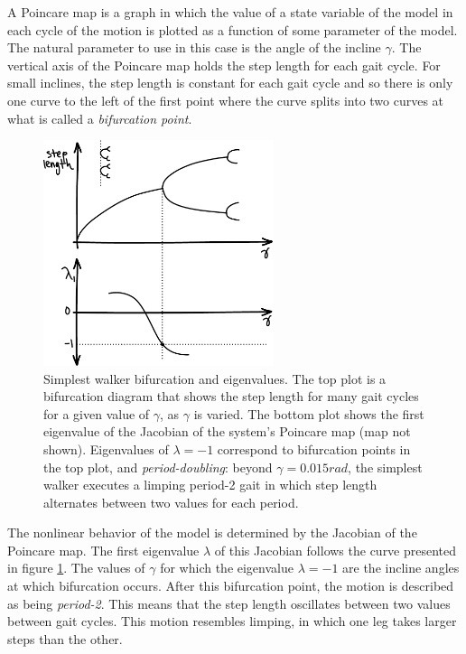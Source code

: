 A Poincare map is a graph in which the value of a state variable of the model in each cycle of the motion is plotted as a function of some parameter of the model. The natural parameter to use in this case is the angle of the incline $\gamma$. The vertical axis of the Poincare map holds the step length for each gait cycle. For small inclines, the step length is constant for each gait cycle and so there is only one curve to the left of the first point where the curve splits into two curves at what is called a \emph{bifurcation point}.

\begin{figure}[h]		%
\begin{centering}
\includegraphics[width=0.6\textwidth]{Figures/SimplestWalkerEigenvalues}\par
\end{centering}
\caption[Plot: Simplest Walker Bifurcation and Eigenvalues]{Simplest walker bifurcation and eigenvalues. The top plot is a bifurcation diagram that shows the step length for many gait cycles for a given value of $\gamma$, as $\gamma$ is varied. The bottom plot shows the first eigenvalue of the Jacobian of the system's Poincare map (map not shown). Eigenvalues of $\lambda = -1$ correspond to bifurcation points in the top plot, and \emph{period-doubling}: beyond $\gamma = 0.015 rad$, the simplest walker executes a limping period-2 gait in which step length alternates between two values for each period.}
\label{fig:SimplestWalkerEigenvalues}
\end{figure}
%

The nonlinear behavior of the model is determined by the Jacobian of the Poincare map. The first eigenvalue $\lambda$ of this Jacobian follows the curve presented in figure \ref{fig:SimplestWalkerEigenvalues}. The values of $\gamma$ for which the eigenvalue $\lambda = -1$ are the incline angles at which bifurcation occurs. After this bifurcation point, the motion is described as being \textit{period-2}. This means that the step length oscillates between two values between gait cycles. This motion resembles limping, in which one leg takes larger steps than the other.

